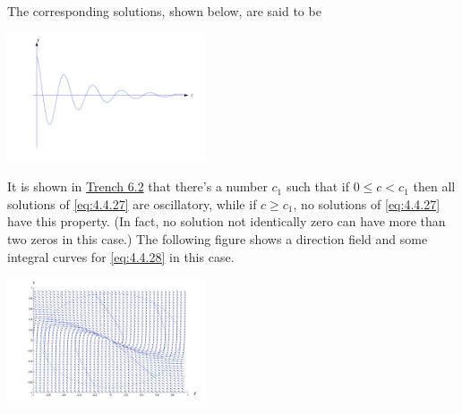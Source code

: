 \documentclass{ximera}
\begin{document}
 
The corresponding solutions, shown below, are said to be 
 
\begin{image}
 \includegraphics[height=1.5in]{fig040413.jpg}
\end{image}
 
 
It is shown in \href{https://ximera.osu.edu/ode/main/springProblemsII/springProblemsII}{Trench 6.2} that there's a number $c_1$ such that if $0\leq
c<c_1$ then  all solutions of \eqref{eq:4.4.27} are oscillatory, while if
$c\geq c_1$,  no solutions of \eqref{eq:4.4.27} have this property. (In
fact, no solution not identically zero can have more than two zeros in
this case.) The following figure shows a direction field and
some integral curves for \eqref{eq:4.4.28} in this case.
 
\begin{image}
 \includegraphics[height=1.5in]{fig040414.jpg}
\end{image}
 
\end{document}
